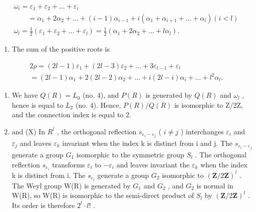 \[
\begin{array}{l} \omega_ {i} = \varepsilon_ {1} + \varepsilon_ {2} + \dots + \varepsilon_ {i} \\ \qquad = \alpha_ {1} + 2 \alpha_ {2} + \dots + (i - 1) \alpha_ {i - 1} + i (\alpha_ {1} + \alpha_ {i + 1} + \dots + \alpha_ {l}) (i <   l) \\ \omega_ {l} = \frac {1}{2} (\varepsilon_ {1} + \varepsilon_ {2} + \dots + \varepsilon_ {l}) = \frac {1}{2} (\alpha_ {1} + 2 \alpha_ {2} + \dots + l \alpha_ {l}). \end{array}
\]

\begin{enumerate}
\def\labelenumi{(\Roman{enumi})}
\setcounter{enumi}{6}
\tightlist
\item
  The sum of the positive roots is
\end{enumerate}

\[
\begin{array}{l} 2 \rho = (2 l - 1) \varepsilon_ {1} + (2 l - 3) \varepsilon_ {2} + \dots + 3 \varepsilon_ {l - 1} + \varepsilon_ {l} \\ = (2 l - 1) \alpha_ {1} + 2 (2 l - 2) \alpha_ {2} + \dots + i (2 l - i) \alpha_ {i} + \dots + l ^ {2} \alpha_ {l}. \end{array}
\]

\begin{enumerate}
\def\labelenumi{(\Roman{enumi})}
\setcounter{enumi}{7}
\item
  We have \(Q(R) = L_{0}\) (no. 4), and \(P(R)\) is generated by \(Q(R)\) and \(\omega_{l}\) , hence is equal to \(L_{2}\) (no. 4). Hence, \(P(R)/Q(R)\) is isomorphic to Z/2Z, and the connection index is equal to 2.
\item
  and (X) In \(R^{l}\) , the orthogonal reflection \(s_{\varepsilon_{i}-\varepsilon_{j}}\) ( \(i \neq j\) ) interchanges \(\varepsilon_{i}\) and \(\varepsilon_{j}\) and leaves \(\varepsilon_{k}\) invariant when the index k is distinct from i and j. The \(s_{\varepsilon_{i}-\varepsilon_{j}}\) generate a group \(G_{1}\) isomorphic to the symmetric group \(S_{l}\) . The orthogonal reflection \(s_{\varepsilon_{i}}\) transforms \(\varepsilon_{i}\) to \(-\varepsilon_{i}\) and leaves invariant the \(\varepsilon_{k}\) when the index k is distinct from i. The \(s_{\varepsilon_{i}}\) generate a group \(G_{2}\) isomorphic to \((\mathbf{Z}/2\mathbf{Z})^{l}\) . The Weyl group W(R) is generated by \(G_{1}\) and \(G_{2}\) , and \(G_{2}\) is normal in W(R), so W(R) is isomorphic to the semi-direct product of \(S_{l}\) by \((\mathbf{Z}/2\mathbf{Z})^{l}\) . Its order is therefore \(2^{l}\cdot l!\) .
\end{enumerate}


